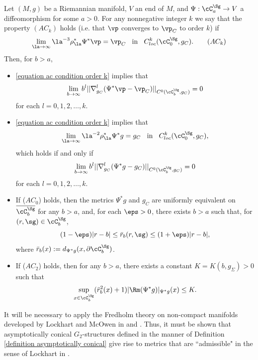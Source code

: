 \documentclass[hidelinks, 12pt, oneside, reqno]{amsart}
\begin{document}
\begin{lem}\label{lemma decay estimates on AC G2 forms}
Let $(M, g)$ be a Riemannian manifold, $V$ an end of $M$, and $\Psi : \cC^\Sg_a \rightarrow V$ a diffeomorphism for some $a > 0$. For any nonnegative integer $k$ we say that the property $(AC_k)$ holds (i.e. that $\vp$ converges to $\vp_C$ to order $k$) if
\begin{equation}\label{equation ac condition order k}
    \lim_{\la \rightarrow \infty} \la^{-3} \rho_\la^* \Psi^* \vp = \vp_C \;\; \text{ in } \;\;C^k_{loc}(\cC^\Sg_0, g_C). \tag{$AC_k$} 
\end{equation}
Then, for $b > a$,
\begin{itemize}
    \item[(a)]\eqref{equation ac condition order k} implies that
    \[\lim_{b \rightarrow \infty} b^l || \nabla^{l}_{g_C} (\Psi^*\vp - \vp_C)||_{C^0(\cC^\Sg_b, g_C)} = 0
    \]
    for each $l =0,1,2,\ldots, k$.
    \item[(b)] \eqref{equation ac condition order k} implies that 
    \[ \lim_{\la \rightarrow \infty} \la^{-2} \rho_{\la}^{*} \Psi^* g = g_{C} \;\; \text{ in } \;\;C^k_{loc}(\cC^\Sg_0, g_C),\]
    which holds if and only if
    \[\lim_{b \rightarrow \infty} b^l || \nabla^{l}_{g_C} (\Psi^*g - g_C)||_{C^0(\cC^\Sg_b, g_C)} = 0
    \]
    for each $l =0,1,2,\ldots, k$.
    \item[(c)] If ($AC_0$) holds, then the metrics $\Psi^*g$ and $g_C$ are uniformly equivalent on $\overline{\cC^\Sg_b}$ for any $b>a$, and, for each $\eps >0$, there exists $b > a$ such that, for $(r, \sg) \in \cC^\Sg_b$, 
    \begin{equation}
        (1- \eps)|r-b| \le \bar{r}_b(r, \sg) \le (1+ \eps) |r-b|,
    \end{equation}
    where $\bar{r}_b(x) := d_{\Psi^*g}(x, \partial \cC^\Sg_b)$.
    \item[(d)] If ($AC_2$) holds, then for any $b >a$, there exists a constant $K = K(b, g_{\Sigma}) > 0$ such that
    \begin{equation}
        \sup_{x \in \cC^\Sg_b} (\bar{r}_b^2(x) + 1) |\Rm(\Psi^*g)|_{\Psi^*g}(x) \le K.
    \end{equation}
\end{itemize}
\end{lem}

It will be necessary to apply the Fredholm theory on non-compact manifolds developed by Lockhart and McOwen in \cite{LockhartMcOwen1985} and \cite{Lockhart1987}. Thus, it must be shown that asymptotically conical $G_2$-structures defined in the manner of Definition \ref{definition asymptotically conical} give rise to metrics that are ``admissible" in the sense of Lockhart in \cite{Lockhart1987}. 
\end{document}
